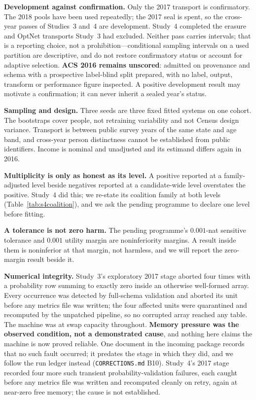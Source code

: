 \documentclass[10pt]{article}
\begin{document}
\textbf{Development against confirmation.} Only the 2017 transport is confirmatory. The 2018 pools
have been used repeatedly; the 2017 seal is spent, so the cross-year passes of Studies~3 and~4 are
development. Study~4 completed the erasure and OptNet transports Study~3 had excluded. Neither pass carries
intervals; that is a reporting choice, not a prohibition---conditional sampling intervals on a used
partition are descriptive, and do not restore confirmatory status or account for adaptive selection. \textbf{ACS 2016
remains unscored}: admitted on provenance and schema with a prospective label-blind split prepared,
with no label, output, transform or performance figure inspected. A positive development result may
motivate a confirmation; it can never inherit a sealed year's status.

\textbf{Sampling and design.} Three seeds are three fixed fitted systems on one cohort. The bootstraps
cover people, not retraining variability and not Census design variance. Transport is between public
survey years of the same state and age band, and cross-year person distinctness cannot be established
from public identifiers. Income is nominal and unadjusted and its estimand differs again in 2016.

\textbf{Multiplicity is only as honest as its level.} A positive reported at a family-adjusted level
beside negatives reported at a candidate-wide level overstates the positive. Study~4 did this; we
re-state its coalition family at both levels (Table~\ref{tab:s4coalition}), and we ask the pending
programme to declare one level before fitting.

\textbf{A tolerance is not zero harm.} The pending programme's $0.001$-nat sensitive tolerance and
$0.001$ utility margin are noninferiority margins. A result inside them is noninferior at that margin,
not harmless, and we will report the zero-margin result beside it.

\textbf{Numerical integrity.} Study~3's exploratory 2017 stage aborted four times with a probability
row summing to exactly zero inside an otherwise well-formed array. Every occurrence was detected by
full-schema validation and aborted its unit before any metrics file was written; the four affected
units were quarantined and recomputed by the unpatched pipeline, so no corrupted array reached any
table. The machine was at swap capacity throughout. \textbf{Memory pressure was the observed
condition, not a demonstrated cause}, and nothing here claims the machine is now proved reliable. One
document in the incoming package records that no such fault occurred; it predates the stage in which
they did, and we follow the run ledger instead (\texttt{CORRECTIONS.md} B10). Study~4's 2017 stage
recorded four more such transient probability-validation failures, each caught before any metrics
file was written and recomputed cleanly on retry, again at near-zero free memory; the cause is not
established.
\end{document}
